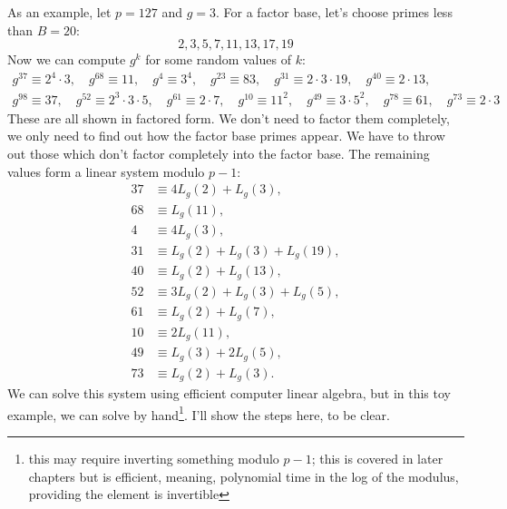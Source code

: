 \documentclass{article}
\theoremstyle{plain}
\theoremstyle{definition}
\theoremstyle{remark}
\numberwithin{theorem}{section}
\begin{document}
As an example, let $p=127$ and $g=3$.  For a factor base, let's choose primes less than $B = 20$:
\[
	2,3,5,7,11,13,17,19
\]
Now we can compute $g^k$ for some random values of $k$:
\begin{gather*}
	g^{37} \equiv 2^4\cdot 3, \quad
	g^{68} \equiv 11, \quad
	g^{4} \equiv 3^4, \quad
	g^{23} \equiv 83, \quad
	g^{31} \equiv 2 \cdot 3 \cdot 19, \quad 
	g^{40} \equiv 2 \cdot 13, \quad \\
	g^{98} \equiv 37, \quad
	g^{52} \equiv 2^3 \cdot 3 \cdot 5, \quad
	g^{61} \equiv 2 \cdot 7, \quad
	g^{10} \equiv 11^2, \quad
	g^{49} \equiv 3 \cdot 5^2, \quad
	g^{78} \equiv 61, \quad
	g^{73} \equiv 2 \cdot 3
\end{gather*}
These are all shown in factored form.  We don't need to factor them completely, we only need to find out how the factor base primes appear.  We have to throw out those which don't factor completely into the factor base.  The remaining values form a linear system modulo $p-1$:
\begin{align*}
	37 &\equiv 4 L_g(2) + L_g(3), \\
	68 &\equiv L_g(11), \\
	4 &\equiv 4 L_g(3), \\
	31 &\equiv L_g(2) + L_g(3) + L_g(19), \\
	40 &\equiv L_g(2) + L_g(13), \\
	52 &\equiv 3L_g(2) + L_g(3) + L_g(5), \\
	61 &\equiv L_g(2) + L_g(7), \\
	10 &\equiv 2L_g(11), \\
	49 &\equiv L_g(3) + 2L_g(5), \\
	73 &\equiv L_g(2) + L_g(3).
\end{align*}
We can solve this system using efficient computer linear algebra, but in this toy example, we can solve by hand\footnote{this may require inverting something modulo $p-1$; this is covered in later chapters but is efficient, meaning, polynomial time in the log of the modulus, providing the element is invertible}.  I'll show the steps here, to be clear.
\end{document}
